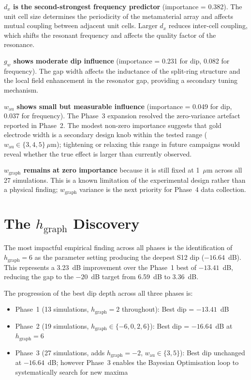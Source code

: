 \documentclass[12pt,a4paper]{report}
\begin{document}
\textbf{$d_x$ is the second-strongest frequency predictor} (importance = 0.382). The unit cell size determines the periodicity of the metamaterial array and affects mutual coupling between adjacent unit cells. Larger $d_x$ reduces inter-cell coupling, which shifts the resonant frequency and affects the quality factor of the resonance.

\textbf{$g_w$ shows moderate dip influence} (importance = 0.231 for dip, 0.082 for frequency). The gap width affects the inductance of the split-ring structure and the local field enhancement in the resonator gap, providing a secondary tuning mechanism.

\textbf{$w_{\text{au}}$ shows small but measurable influence} (importance = 0.049 for dip, 0.037 for frequency). The Phase~3 expansion resolved the zero-variance artefact reported in Phase~2. The modest non-zero importance suggests that gold electrode width is a secondary design knob within the tested range ($w_{\text{au}} \in \{3, 4, 5\}~\mu$m); tightening or relaxing this range in future campaigns would reveal whether the true effect is larger than currently observed.

\textbf{$w_{\text{graph}}$ remains at zero importance} because it is still fixed at 1~$\mu$m across all 27 simulations. This is a known limitation of the experimental design rather than a physical finding; $w_{\text{graph}}$ variance is the next priority for Phase~4 data collection.

\section{The $h_{\text{graph}}$ Discovery}
\label{sec:hgraph_discovery}

The most impactful empirical finding across all phases is the identification of $h_{\text{graph}} = 6$ as the parameter setting producing the deepest S12 dip ($-16.64$~dB). This represents a 3.23~dB improvement over the Phase~1 best of $-13.41$~dB, reducing the gap to the $-20$~dB target from 6.59~dB to 3.36~dB.

The progression of the best dip depth across all three phases is:
\begin{itemize}[leftmargin=2cm]
    \item Phase~1 (13 simulations, $h_{\text{graph}} = 2$ throughout): Best dip = $-13.41$~dB
    \item Phase~2 (19 simulations, $h_{\text{graph}} \in \{-6, 0, 2, 6\}$): Best dip = $-16.64$~dB at $h_{\text{graph}} = 6$
    \item Phase~3 (27 simulations, adds $h_{\text{graph}} = -2$, $w_{\text{au}} \in \{3,5\}$): Best dip unchanged at $-16.64$~dB; however Phase~3 enables the Bayesian Optimisation loop to systematically search for new maxima
\end{itemize}
\end{document}
